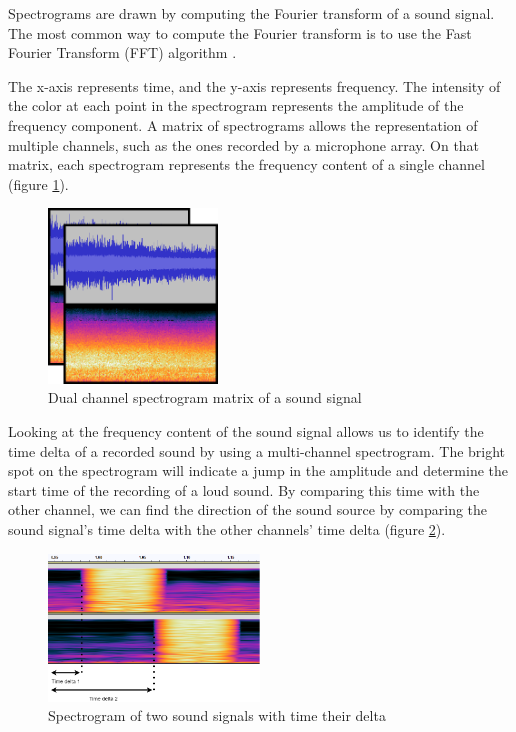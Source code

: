 Spectrograms are drawn by computing the Fourier transform of a sound signal. The most common way to compute the Fourier transform is to use the Fast Fourier Transform (FFT) algorithm \cite{5217220}.

The x-axis represents time, and the y-axis represents frequency. The intensity of the color at each point in the spectrogram represents the amplitude of the frequency component. A matrix of spectrograms allows the representation of multiple channels, such as the ones recorded by a microphone array. On that matrix, each spectrogram represents the frequency content of a single channel (figure \ref*{fig:2_channel_spectrogram_example}).

\begin{figure}[H]
    \centering
    \includegraphics[width=0.4\textwidth]{../Images/2-channel-spectrogram-example.png}
    \caption{Dual channel spectrogram matrix of a sound signal}
    \label{fig:2_channel_spectrogram_example}
\end{figure}

Looking at the frequency content of the sound signal allows us to identify the time delta of a recorded sound by using a multi-channel spectrogram. The bright spot on the spectrogram will indicate a jump in the amplitude and determine the start time of the recording of a loud sound. By comparing this time with the other channel, we can find the direction of the sound source by comparing the sound signal's time delta with the other channels' time delta (figure \ref*{fig:spectrogram_offset}).

\begin{figure}[H]
    \centering
    \includegraphics[width=0.5\textwidth]{../Images/time_delta.png}
    \caption{Spectrogram of two sound signals with time their delta}
    \label{fig:spectrogram_offset}
\end{figure}

